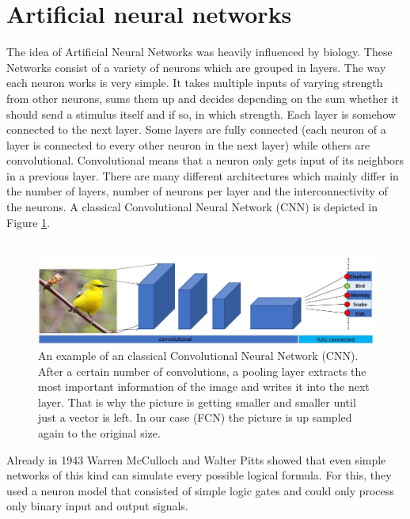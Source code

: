 \section{Artificial neural networks}
The idea of Artificial Neural Networks was heavily influenced by biology. These Networks consist of a variety of neurons which are grouped in layers. The way each neuron works is very simple. It takes multiple inputs of varying strength from other neurons, sums them up and decides depending on the sum whether it should send a stimulus itself and if so, in which strength. Each layer is somehow connected to the next layer. Some layers are fully connected (each neuron of a layer is connected to every other neuron in the next layer) while others are convolutional. Convolutional means that a neuron only gets input of its neighbors in a previous layer. There are many different architectures which mainly differ in the number of layers, number of neurons per layer and the interconnectivity of the neurons. A classical Convolutional Neural Network (CNN) is depicted in Figure \ref{fig:chap1:classicalCNN}.\\
\\
\begin{figure}
	\centering
	\includegraphics[width=1\linewidth]{Figures/chap1/classicalCNN.JPG}
	\caption{An example of an classical Convolutional Neural Network (CNN). After a certain number of convolutions, a pooling layer extracts the most important information of the image and writes it into the next layer. That is why the picture is getting smaller and smaller until just a vector is left. In our case (FCN) the picture is up sampled again to the original size.}
	\label{fig:chap1:classicalCNN}
\end{figure}

Already in 1943 Warren McCulloch and Walter Pitts \cite{mcculloch} showed that even simple networks of this kind can simulate every possible logical formula. For this, they used a neuron model that consisted of simple logic gates and could only process only binary input and output signals.


